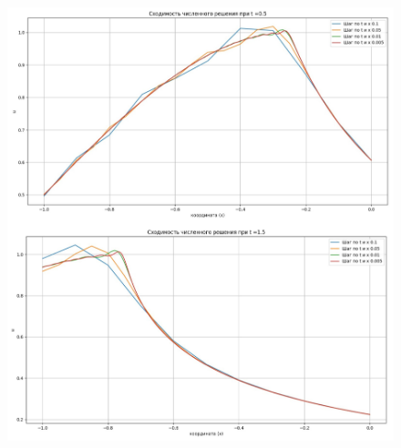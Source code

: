 \documentclass[a4paper,14pt]{article}
\begin{document}
\begin{figure}[h!]
\centering
\includegraphics[scale=0.3]{сходимость2.jpg}
\caption{\label{pic8}}
\end{figure}
\end{document}

